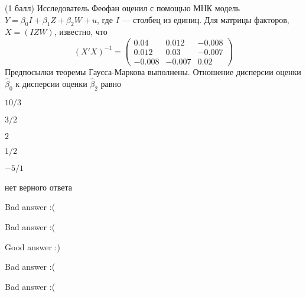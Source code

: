 
\begin{question}
(1 балл) Исследователь Феофан оценил с помощью МНК модель
\(Y = \beta_0 I + \beta_1 Z + \beta_2 W + u\), где \(I\) --- столбец из
единиц. Для матрицы факторов, \(X = (I Z W)\), известно, что \[
(X'X)^{-1} = \begin{pmatrix}
0.04 & 0.012 & -0.008 \\
0.012 & 0.03 & -0.007 \\
-0.008 & -0.007 & 0.02
\end{pmatrix}
\] Предпосылки теоремы Гаусса-Маркова выполнены. Отношение дисперсии
оценки \(\hat \beta_0\) к дисперсии оценки \(\hat \beta_2\) равно
\begin{answerlist}
  \item \(10/3\)
  \item \(3/2\)
  \item \(2\)
  \item \(1/2\)
  \item \(-5/1\)
  \item нет верного ответа
\end{answerlist}
\end{question}

\begin{solution}
\begin{answerlist}
  \item Bad answer :(
  \item Bad answer :(
  \item Good answer :)
  \item Bad answer :(
  \item Bad answer :(
\end{answerlist}
\end{solution}
